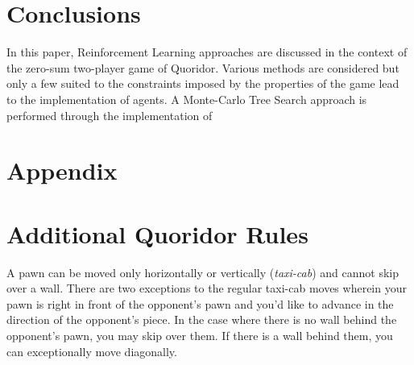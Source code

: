\documentclass[journal, a4paper]{IEEEtran}
\begin{document}
\section{Conclusions}
\label{sec:conclusion}
In this paper, Reinforcement Learning approaches are discussed in the context of the zero-sum two-player game of Quoridor. Various methods are considered but only a few suited to the constraints imposed by the properties of the game lead to the implementation of agents. A Monte-Carlo Tree Search approach is performed through the implementation of  

\newpage
\section{Appendix}\label{sec:appendix}

\section*{Additional Quoridor Rules}\label{sec:quoridor-details}
A pawn can be moved only horizontally or vertically (\textit{taxi-cab}) and cannot skip over a wall. 
There are two exceptions to the regular taxi-cab moves wherein your pawn is right in front of the opponent's pawn and you'd like to advance in the direction of the opponent's piece. In the case where there is no wall behind the opponent's pawn, you may skip over them. If there is a wall behind them, you can exceptionally move diagonally.
\end{document}
